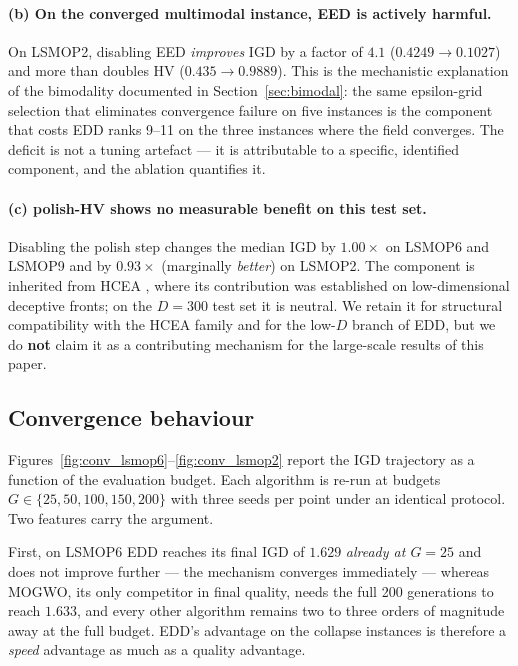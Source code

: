 \documentclass[preprint,12pt]{elsarticle}
\begin{document}
\paragraph{(b) On the converged multimodal instance, EED is actively
harmful.} On LSMOP2, disabling EED \emph{improves} IGD by a factor of $4.1$
($0.4249 \to 0.1027$) and more than doubles HV ($0.435 \to 0.9889$). This is
the mechanistic explanation of the bimodality documented in
Section~\ref{sec:bimodal}: the same epsilon-grid selection that eliminates
convergence failure on five instances is the component that costs EDD ranks
9--11 on the three instances where the field converges. The deficit is not a
tuning artefact --- it is attributable to a specific, identified component,
and the ablation quantifies it.

\paragraph{(c) polish-HV shows no measurable benefit on this test set.}
Disabling the polish step changes the median IGD by $1.00\times$ on LSMOP6
and LSMOP9 and by $0.93\times$ (marginally \emph{better}) on LSMOP2. The
component is inherited from HCEA \cite{hcea2026}, where its contribution was
established on low-dimensional deceptive fronts; on the $D = 300$ test set it
is neutral. We retain it for structural compatibility with the HCEA family
and for the low-$D$ branch of EDD, but we do \textbf{not} claim it as a
contributing mechanism for the large-scale results of this paper.

\subsection{Convergence behaviour}

Figures~\ref{fig:conv_lsmop6}--\ref{fig:conv_lsmop2} report the IGD
trajectory as a function of the evaluation budget. Each algorithm is
re-run at budgets $G \in \{25, 50, 100, 150, 200\}$ with three seeds
per point under an identical protocol. Two features carry the argument.

First, on LSMOP6 EDD reaches its final IGD of $1.629$ \emph{already at
$G = 25$} and does not improve further --- the mechanism converges
immediately --- whereas MOGWO, its only competitor in final quality, needs
the full 200 generations to reach $1.633$, and every other algorithm remains
two to three orders of magnitude away at the full budget. EDD's advantage on
the collapse instances is therefore a \emph{speed} advantage as much as a
quality advantage.
\end{document}
